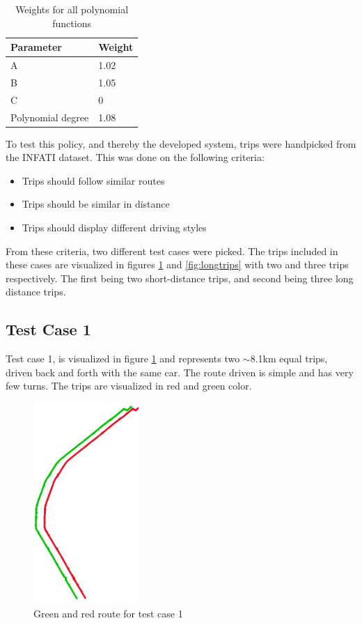\begin{table}
    \centering
    \begin{tabular}{ll}
    \textbf{Parameter} & \textbf{Weight} \\ \hline
    A                  & 1.02            \\
    B                  & 1.05            \\
    C                  & 0               \\
    Polynomial degree  & 1.08            \\ \hline
    \end{tabular}
    \caption{Weights for all polynomial functions}
    \label{tab:polyvalues}
\end{table}

To test this policy, and thereby the developed system, trips were handpicked from the INFATI dataset\cite{art:INFATI}. This was done on the following criteria:

\begin{itemize}
  \item Trips should follow similar routes
  \item Trips should be similar in distance
  \item Trips should display different driving styles
\end{itemize}

From these criteria, two different test cases were picked. The trips included in these cases are visualized in figures \ref{fig:shorttrips} and \ref{fig:longtrips} with two and three trips respectively. The first being two short-distance trips, and second being three long distance trips.

\subsection{Test Case 1} \label{subsec:expe1}
Test case 1, is visualized in figure \ref{fig:shorttrips} and represents two $\sim$8.1km equal trips, driven back and forth with the same car. The route driven is simple and has very few turns. The trips are visualized in red and green color.

\begin{figure}[tb]
    \centering
    \includegraphics[width=40mm]{Pictures/ShortTrips.png}
    \caption{Green and red route for test case 1}
    \label{fig:shorttrips}
\end{figure}

